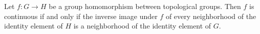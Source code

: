 Let $f: G \to H$ be a group homomorphism between topological groups. Then $f$ is continuous if and only if the inverse image under $f$ of every neighborhood of the identity element of $H$ is a neighborhood of the identity element of $G$.
